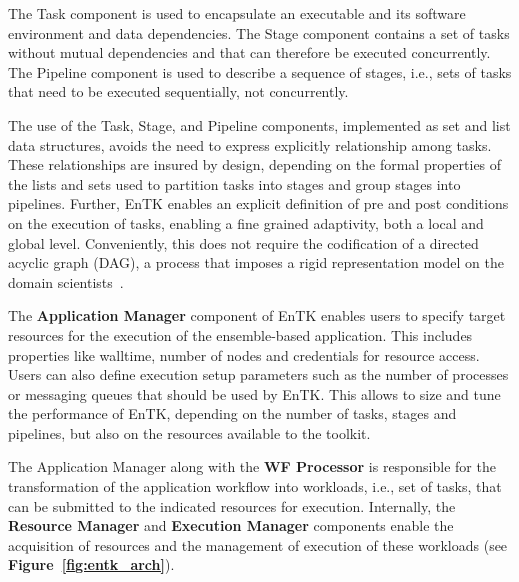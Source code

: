 The Task component is used to encapsulate an executable and its software
environment and data dependencies. The Stage component contains a set of
tasks without mutual dependencies and that can therefore be executed
concurrently. The Pipeline component is used to describe a sequence of
stages, i.e., sets of tasks that need to be executed sequentially, not
concurrently.

The use of the Task, Stage, and Pipeline components, implemented as set and
list data structures, avoids the need to express explicitly relationship
among tasks. These relationships are insured by design, depending on the
formal properties of the lists and sets used to partition tasks into stages
and group stages into pipelines. Further, EnTK enables an explicit definition
of pre and post conditions on the execution of tasks, enabling a fine grained
adaptivity, both a local and global level. Conveniently, this does not
require the codification of a directed acyclic graph (DAG), a process that
imposes a rigid representation model on the domain
scientists~\cite{balasubramanian2017powerofmany}.


The \textbf{Application Manager} component of EnTK enables users to specify
target resources for the execution of the ensemble-based application. This
includes properties like walltime, number of nodes and credentials for
resource access. Users can also define execution setup parameters such as the
number of processes or messaging queues that should be used by EnTK\@. This
allows to size and tune the performance of EnTK, depending on the number of
tasks, stages and pipelines, but also on the resources available to the
toolkit.

The Application Manager along with the \textbf{WF Processor} is responsible
for the transformation of the application workflow into workloads, i.e., set
of tasks, that can be submitted to the indicated resources for execution.
Internally, the \textbf{Resource Manager} and \textbf{Execution Manager}
components enable the acquisition of resources and the management of
execution of these workloads (see \textbf{Figure~\ref{fig:entk_arch}}).




